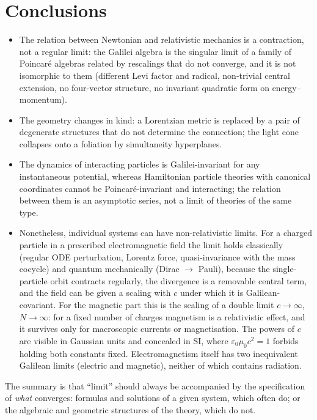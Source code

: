 \documentclass[11pt,a4paper]{article}
\newcommand{\eps}{\varepsilon}
\theoremstyle{plain}
\theoremstyle{definition}
\theoremstyle{remark}
\begin{document}
\section{Conclusions}\label{sec:conclusion}
\begin{itemize}[itemsep=2pt]
\item The relation between Newtonian and relativistic mechanics is a contraction, not a regular
limit: the Galilei algebra is the singular limit of a family of Poincar\'e algebras related by
rescalings that do not converge, and it is not isomorphic to them (different Levi factor and
radical, non-trivial central extension, no four-vector structure, no invariant quadratic form on
energy--momentum).
\item The geometry changes in kind: a Lorentzian metric is replaced by a pair of degenerate
structures that do not determine the connection; the light cone collapses onto a foliation by
simultaneity hyperplanes.
\item The dynamics of interacting particles is Galilei-invariant for any instantaneous potential,
whereas Hamiltonian particle theories with canonical coordinates cannot be Poincar\'e-invariant
and interacting; the relation between them is an asymptotic series, not a limit of theories of the same type.
\item Nonetheless, individual systems can have non-relativistic limits. For a charged particle in a
prescribed electromagnetic field the limit holds classically (regular ODE perturbation, Lorentz
force, quasi-invariance with the mass cocycle) and quantum mechanically (Dirac $\to$ Pauli),
because the single-particle orbit contracts regularly, the divergence is a removable central term,
and the field can be given a scaling with $c$ under which it is Galilean-covariant. For the magnetic
part this is the scaling of a double limit $c\to\infty$, $N\to\infty$: for a fixed number of charges
magnetism is a relativistic effect, and it survives only for macroscopic currents or magnetisation.
The powers of $c$ are visible in Gaussian units and concealed in SI, where $\eps_0\mu_0c^2=1$
forbids holding both constants fixed. Electromagnetism itself has two
inequivalent Galilean limits (electric and magnetic), neither of which contains radiation.
\end{itemize}
The summary is that ``limit'' should always be accompanied by the specification of
\emph{what} converges: formulas and solutions of a given system, which often do; or the algebraic and
geometric structures of the theory, which do not.
\end{document}
